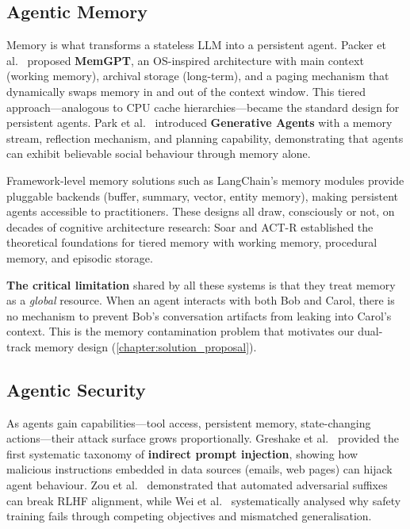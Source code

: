 \subsection{Agentic Memory}

Memory is what transforms a stateless LLM into a persistent agent. Packer et al.\ \cite{packer2024memgpt} proposed \textbf{MemGPT}, an OS-inspired architecture with main context (working memory), archival storage (long-term), and a paging mechanism that dynamically swaps memory in and out of the context window. This tiered approach---analogous to CPU cache hierarchies---became the standard design for persistent agents. Park et al.\ \cite{park2023generative} introduced \textbf{Generative Agents} with a memory stream, reflection mechanism, and planning capability, demonstrating that agents can exhibit believable social behaviour through memory alone.

Framework-level memory solutions such as LangChain's memory modules \cite{langchain2023} provide pluggable backends (buffer, summary, vector, entity memory), making persistent agents accessible to practitioners. These designs all draw, consciously or not, on decades of cognitive architecture research: Soar \cite{laird2012soar} and ACT-R \cite{anderson2007actr} established the theoretical foundations for tiered memory with working memory, procedural memory, and episodic storage.

\textbf{The critical limitation} shared by all these systems is that they treat memory as a \textit{global} resource. When an agent interacts with both Bob and Carol, there is no mechanism to prevent Bob's conversation artifacts from leaking into Carol's context. This is the memory contamination problem that motivates our dual-track memory design (\cref{chapter:solution_proposal}).

\subsection{Agentic Security}

As agents gain capabilities---tool access, persistent memory, state-changing actions---their attack surface grows proportionally. Greshake et al.\ \cite{greshake2023not} provided the first systematic taxonomy of \textbf{indirect prompt injection}, showing how malicious instructions embedded in data sources (emails, web pages) can hijack agent behaviour. Zou et al.\ \cite{zou2023universal} demonstrated that automated adversarial suffixes can break RLHF alignment, while Wei et al.\ \cite{wei2024jailbroken} systematically analysed why safety training fails through competing objectives and mismatched generalisation.

